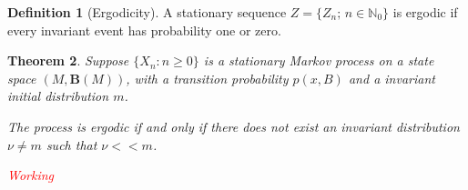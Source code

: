 \documentclass[a4paper]{article}
\theoremstyle{plain}
\newtheorem{theorem}{Theorem}[section] %
\theoremstyle{definition}
\newtheorem{defn}[theorem]{Definition}%
\begin{document}
    \begin{defn}[Ergodicity] A stationary sequence $Z = \{Z_{n};\, n \in \mathbb{N}_0\}$ is ergodic if every invariant event has probability one or zero.       
    \end{defn}

    \begin{theorem}\label{Markov Ergodic} Suppose $\{X_n: n \geq 0\}$ is a stationary Markov process on a state space $(M, \mathbf{B}(M))$, with a transition probability $p(x,B)$ and a invariant initial distribution $m$. 

    The process is ergodic if and only if there does not exist an invariant distribution $\nu \neq m$ such that $\nu << m$.

    \proof \textcolor{red}{Working}
        
    \end{theorem}
\end{document}
